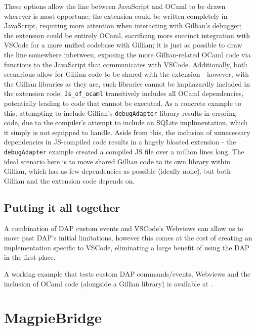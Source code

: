 These options allow the line between JavaScript and OCaml to be drawn wherever
is most opportune; the extension could be written completely in JavaScript,
requiring more attention when interacting with Gillian's debugger; the
extension could be entirely OCaml, sacrificing more succinct integration with
VSCode for a more unified codebase with Gillian; it is just as possible to draw
the line somewhere inbetween, exposing the more Gillian-related OCaml code via
functions to the JavaScript that communicates with VSCode. Additionally, both
scenarious allow for Gillian code to be shared with the extension - however,
with the Gillian libraries as they are, such libraries cannot be haphazardly
included in the extension code; \texttt{Js\_of\_ocaml} transitively includes all
OCaml dependencies, potentially leading to code that cannot be executed. As a
concrete example to this, attempting to include Gillian's \texttt{debugAdapter}
library results in erroring code, due to the compiler's attempt to include an
SQLite implimentation, which it simply is not equipped to handle. Aside from
this, the inclusion of unnecessary dependencies in JS-compiled code results in
a hugely bloated extension - the \texttt{debugAdapter} example created a
compiled JS file over a million lines long. The ideal scenario here is to move
shared Gillian code to its own library within Gillian, which has as few
dependencies as possible (ideally none), but both Gillian and the extension
code depends on.

\subsection{Putting it all together}

A combination of DAP custom events and VSCode's Webviews can allow us to move
past DAP's initial limitations, however this comes at the cost of creating an
implementation specific to VSCode, eliminating a large benefit of using the DAP
in the first place.

A working example that tests custom DAP commands/events, Webviews and the
inclusion of OCaml code (alongside a Gillian library) is available at
\cite{debugger-experiment}.

\section{MagpieBridge}
